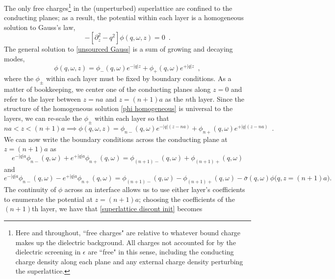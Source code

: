 \documentclass[submission, Phys]{SciPost}
\newcommand{\lb}{\left[}
\newcommand{\rb}{\right]}
\newcommand{\e}{\epsilon}
\begin{document}
The only free charges\footnote{Here and throughout, ``free charges" are relative to whatever bound charge makes up the dielectric background.  All charges not accounted for by the dielectric screening in $\e$ are ``free" in this sense, including the conducting charge density along each plane and any external charge density perturbing the superlattice.} in the (unperturbed) superlattice are confined to the conducting planes; as a result, the potential within each layer is a homogeneous solution to Gauss's law,
\begin{equation}
    \label{unsourced Gauss}
    -\lb\partial_z^2-q^2\rb\phi(q,\omega,z) = 0
    \,\,\,.
\end{equation}
The general solution to \eqref{unsourced Gauss} is a sum of growing and decaying modes,
\begin{equation}
    \label{phi homogeneous}
    \phi(q,\omega,z) = \phi_-(q,\omega) e^{-|q|z} + \phi_+(q,\omega) e^{+|q|z}
    \,\,\,,
\end{equation}
where the $\phi_\pm$ within each layer must be fixed by boundary conditions.  As a matter of bookkeeping, we center one of the conducting planes along $z=0$ and refer to the layer between $z=na$ and $z=(n+1)a$ as the $n$th layer.  Since the structure of the homogeneous solution \eqref{phi homogeneous} is universal to the layers, we can re-scale the $\phi_{\pm}$ within each layer so that
\begin{equation}
    \label{nth layer phi}
    na<z<(n+1)a\implies
    \phi(q,\omega,z) = \phi_{n-}(q,\omega) e^{-|q|(z-na)} + \phi_{n+}(q,\omega)e^{+|q|(z-na)}
    \,\,\,.
\end{equation}
We can now write the boundary conditions across the conducting plane at $z=(n+1)a$ as
\begin{equation}
    \label{superlattice cont init}
    e^{-|q|a} \phi_{n-}(q,\omega) + e^{+|q|a}\phi_{n+}(q,\omega) = 
    \phi_{(n+1)-}(q,\omega)+\phi_{(n+1)+}(q,\omega)
\end{equation}
and
\begin{equation}
    \label{superlattice discont init}
    e^{-|q|a} \phi_{n-}(q,\omega) - e^{+|q|a}\phi_{n+}(q,\omega) = 
    \phi_{(n+1)-}(q,\omega)-\phi_{(n+1)+}(q,\omega)
    -
    \bar\sigma(q,\omega)\phi\big(q,z=(n+1)a\big)
    .
\end{equation}
The continuity of $\phi$ across an interface allows us to use either layer's coefficients to enumerate the potential at $z=(n+1)a$; choosing the coefficients of the $(n+1)$th layer, we have that \eqref{superlattice discont init} becomes
\end{document}
